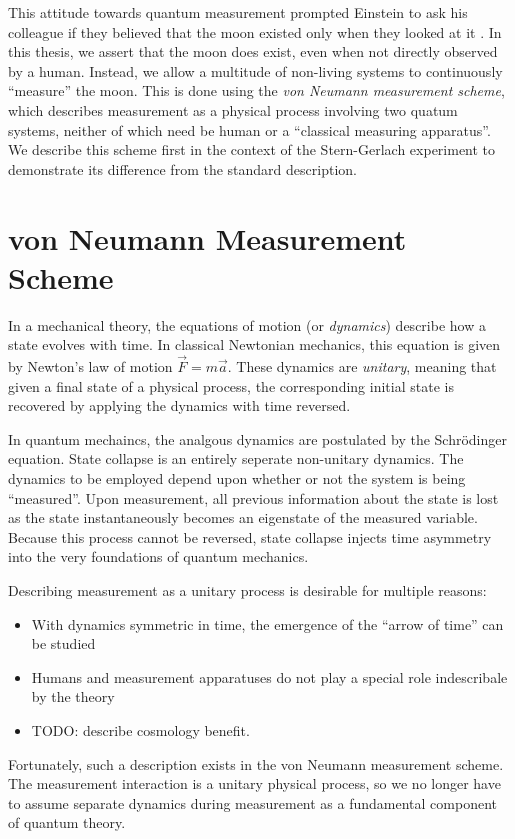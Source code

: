 This attitude towards quantum measurement prompted Einstein to ask his colleague if they believed that the moon existed only when they looked at it \cite{Pais}. In this thesis, we assert that the moon does exist, even when not directly observed by a human. Instead, we allow a multitude of non-living systems to continuously ``measure'' the moon. This is done using the \textit{von Neumann measurement scheme}, which describes measurement as a physical process involving two quatum systems, neither of which need be human or a ``classical measuring apparatus''. We describe this scheme first in the context of the Stern-Gerlach experiment to demonstrate its difference from the standard description.

\section{von Neumann Measurement Scheme}

In a mechanical theory, the equations of motion (or \textit{dynamics}) describe how a state evolves with time. In classical Newtonian mechanics, this equation is given by Newton's law of motion $\vec{F} = m\vec{a}$. These dynamics are \textit{unitary}, meaning that given a final state of a physical process, the corresponding initial state is recovered by applying the dynamics with time reversed.

In quantum mechaincs, the analgous dynamics are postulated by the Schrödinger equation. State collapse is an entirely seperate non-unitary dynamics. The dynamics to be employed depend upon whether or not the system is being ``measured''. Upon measurement, all previous information about the state is lost as the state instantaneously becomes an eigenstate of the measured variable. Because this process cannot be reversed, state collapse injects time asymmetry into the very foundations of quantum mechanics.

Describing measurement as a unitary process is desirable for multiple reasons:
\begin{itemize}
  \item With dynamics symmetric in time, the emergence of the ``arrow of time'' can be studied
  \item Humans and measurement apparatuses do not play a special role indescribale by the theory
  \item TODO: describe cosmology benefit.
\end{itemize}

Fortunately, such a description exists in the von Neumann measurement scheme. The measurement interaction is a unitary physical process, so we no longer have to assume separate dynamics during measurement as a fundamental component of quantum theory.

